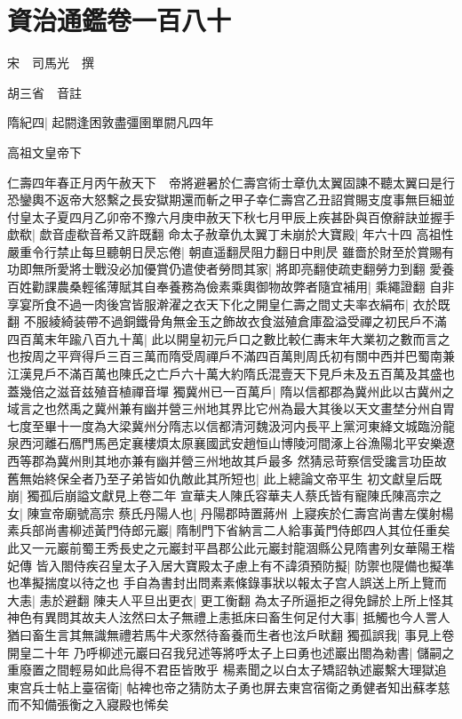 \chapter{資治通鑑卷一百八十}
宋　司馬光　撰

胡三省　音註

隋紀四|{
	起閼逢困敦盡彊圉單閼凡四年}


高祖文皇帝下

仁壽四年春正月丙午赦天下　帝將避暑於仁壽宫術士章仇太翼固諫不聽太翼曰是行恐鑾輿不返帝大怒繫之長安獄期還而斬之甲子幸仁壽宫乙丑詔賞賜支度事無巨細並付皇太子夏四月乙卯帝不豫六月庚申赦天下秋七月甲辰上疾甚卧與百僚辭訣並握手歔欷|{
	歔音虛欷音希又許既翻}
命太子赦章仇太翼丁未崩於大寶殿|{
	年六十四}
高祖性嚴重令行禁止每旦聽朝日昃忘倦|{
	朝直遥翻昃阻力翻日中則昃}
雖嗇於財至於賞賜有功即無所愛將士戰没必加優賞仍遣使者勞問其家|{
	將即亮翻使疏吏翻勞力到翻}
愛養百姓勸課農桑輕徭薄賦其自奉養務為儉素乘輿御物故弊者隨宜補用|{
	乘繩證翻}
自非享宴所食不過一肉後宫皆服澣濯之衣天下化之開皇仁壽之間丈夫率衣絹布|{
	衣於既翻}
不服綾綺装帶不過銅鐵骨角無金玉之飾故衣食滋殖倉庫盈溢受禪之初民戶不滿四百萬末年踰八百九十萬|{
	此以開皇初元戶口之數比較仁夀末年大業初之數而言之也按周之平齊得戶三百三萬而隋受周禪戶不滿四百萬則周氏初有關中西并巴蜀南兼江漢見戶不滿百萬也陳氏之亡戶六十萬大約隋氏混壹天下見戶未及五百萬及其盛也蓋幾倍之滋音兹殖音植禪音墠}
獨冀州已一百萬戶|{
	隋以信都郡為冀州此以古冀州之域言之也然禹之冀州兼有幽并營三州地其界比它州為最大其後以天文畫埜分州自胃七度至畢十一度為大梁冀州分隋志以信都清河魏汲河内長平上黨河東絳文城臨汾龍泉西河離石鴈門馬邑定襄樓煩太原襄國武安趙恒山博陵河間涿上谷漁陽北平安樂遼西等郡為冀州則其地亦兼有幽并營三州地故其戶最多}
然猜忌苛察信受讒言功臣故舊無始終保全者乃至子弟皆如仇敵此其所短也|{
	此上總論文帝平生}
初文獻皇后既崩|{
	獨孤后崩謚文獻見上卷二年}
宣華夫人陳氏容華夫人蔡氏皆有寵陳氏陳高宗之女|{
	陳宣帝廟號高宗}
蔡氏丹陽人也|{
	丹陽郡時置蔣州}
上寢疾於仁壽宫尚書左僕射楊素兵部尚書柳述黃門侍郎元巖|{
	隋制門下省納言二人給事黃門侍郎四人其位任重矣此又一元巖前蜀王秀長史之元巖封平昌郡公此元巖封龍涸縣公見隋書列女華陽王楷妃傳}
皆入閤侍疾召皇太子入居大寶殿太子慮上有不諱須預防擬|{
	防禦也隄備也擬凖也凖擬揣度以待之也}
手自為書封出問素素條錄事狀以報太子宫人誤送上所上覽而大恚|{
	恚於避翻}
陳夫人平旦出更衣|{
	更工衡翻}
為太子所逼拒之得免歸於上所上怪其神色有異問其故夫人泫然曰太子無禮上恚抵床曰畜生何足付大事|{
	抵觸也今人詈人猶曰畜生言其無識無禮若馬牛犬豕然待畜養而生者也泫戶畎翻}
獨孤誤我|{
	事見上卷開皇二十年}
乃呼柳述元巖曰召我兒述等將呼太子上曰勇也述巖出閤為勑書|{
	儲嗣之重廢置之間輕易如此烏得不君臣皆敗乎}
楊素聞之以白太子矯詔執述巖繫大理獄追東宫兵士帖上臺宿衛|{
	帖裨也帝之猜防太子勇也屏去東宫宿衛之勇健者知出蘇孝慈而不知備張衡之入寢殿也悕矣}
